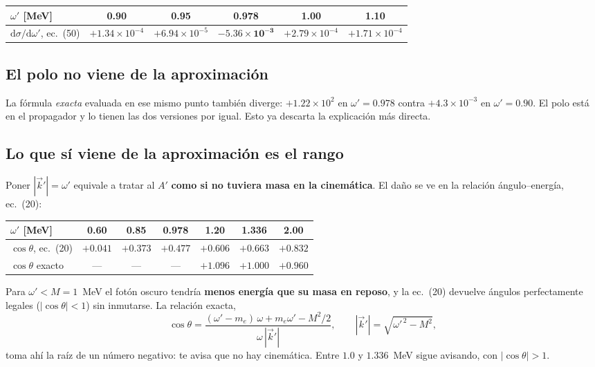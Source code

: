 \documentclass[11pt,a4paper]{article}
\newcommand{\Ap}{A'}
\newcommand{\dd}{\mathrm{d}}
\newcommand{\wpr}{\omega'}
\begin{document}
\begin{center}\small
\begin{tabular}{@{}lccccc@{}}
\toprule
$\wpr$ [MeV] & 0.90 & 0.95 & \textbf{0.978} & 1.00 & 1.10\\
\midrule
$\dd\sigma/\dd\wpr$, ec.~(50) & $+1.34\times10^{-4}$ & $+6.94\times10^{-5}$ & $\bm{-5.36\times10^{-3}}$ & $+2.79\times10^{-4}$ & $+1.71\times10^{-4}$\\
\bottomrule
\end{tabular}
\end{center}

\subsection{El polo no viene de la aproximación}
La fórmula \emph{exacta} evaluada en ese mismo punto también diverge: $+1.22\times10^{2}$ en $\wpr=0.978$ contra
$+4.3\times10^{-3}$ en $\wpr=0.90$. El polo está en el propagador y lo tienen las dos versiones por igual. Esto ya
descarta la explicación más directa.

\subsection{Lo que sí viene de la aproximación es el rango}
Poner $|\vec k'|=\wpr$ equivale a tratar al $\Ap$ \textbf{como si no tuviera masa en la cinemática}. El daño se ve en
la relación ángulo--energía, ec.~(20):

\begin{center}\small
\begin{tabular}{@{}lcccccc@{}}
\toprule
$\wpr$ [MeV] & 0.60 & 0.85 & 0.978 & 1.20 & \textbf{1.336} & 2.00\\
\midrule
$\cos\theta$, ec.~(20) & $+0.041$ & $+0.373$ & $+0.477$ & $+0.606$ & $+0.663$ & $+0.832$\\
$\cos\theta$ exacto & --- & --- & --- & $+1.096$ & $\bm{+1.000}$ & $+0.960$\\
\bottomrule
\end{tabular}
\end{center}

\noindent Para $\wpr<M=1$~MeV el fotón oscuro tendría \textbf{menos energía que su masa en reposo}, y la ec.~(20)
devuelve ángulos perfectamente legales ($|\cos\theta|<1$) sin inmutarse. La relación exacta,
\begin{equation}
\cos\theta=\frac{(\wpr-m_e)\,\omega+m_e\wpr-M^2/2}{\omega\,|\vec k'|},
\qquad |\vec k'|=\sqrt{\wpr^{\,2}-M^2},
\label{eq:costheta}
\end{equation}
toma ahí la raíz de un número negativo: te avisa que no hay cinemática. Entre $1.0$ y $1.336$~MeV sigue avisando, con
$|\cos\theta|>1$.
\end{document}
